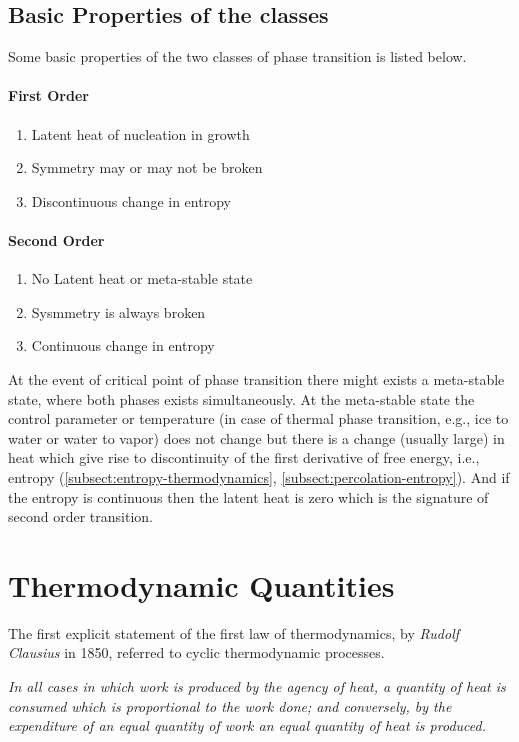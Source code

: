 	\subsection{Basic Properties of the classes}
	Some basic properties of the two classes of phase transition is listed below.
	\paragraph{First Order}
		\begin{enumerate}
			\item Latent heat of nucleation in growth
			\item Symmetry may or may not be broken
			\item Discontinuous change in entropy
		\end{enumerate}
	
	\paragraph{Second Order}
		\begin{enumerate}
			\item No Latent heat or meta-stable state
			\item Sysmmetry is always broken
			\item Continuous change in entropy
		\end{enumerate}
	At the event of critical point of phase transition there might exists a meta-stable state, where both phases exists simultaneously. At the meta-stable state the control parameter or temperature (in case of thermal phase transition, e.g., ice to water or water to vapor) does not change but there is a change (usually large) in heat which give rise to discontinuity of the first derivative of free energy, i.e., entropy (\ref{subsect:entropy-thermodynamics}, \ref{subsect:percolation-entropy}). And if the entropy is continuous then the latent heat is zero which is the signature of second order transition.

	
	
\section{Thermodynamic Quantities}
	The first explicit statement of the first law of thermodynamics, by \textit{Rudolf Clausius} in 1850, referred to cyclic thermodynamic processes.
	
	
	\textit{In all cases in which work is produced by the agency of heat, a quantity of heat is consumed which is proportional to the work done; and conversely, by the expenditure of an equal quantity of work an equal quantity of heat is produced.}
	
